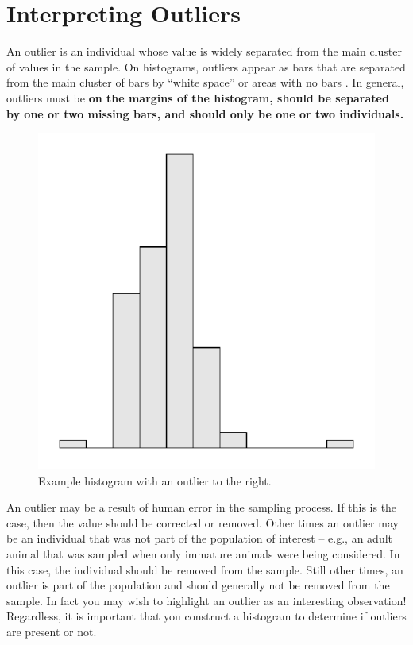 \documentclass[10pt,openany]{book}\usepackage[]{graphicx}\usepackage[]{color}
\newenvironment{knitrout}{}{} %
\begin{document}

\section{Interpreting Outliers}
An outlier is an individual whose value is widely separated from the main cluster of values in the sample. On histograms, outliers appear as bars that are separated from the main cluster of bars by ``white space'' or areas with no bars . In general, outliers must be \textbf{on the margins of the histogram, should be separated by one or two missing bars, and should only be one or two individuals.}

\begin{knitrout}
\color{fgcolor}\begin{figure}[hbtp]

{\centering \includegraphics[width=.4\linewidth]{Figs/OutlierExHist-1} 

}

\caption[Example histogram with an outlier to the right]{Example histogram with an outlier to the right.}\label{fig:OutlierExHist}
\end{figure}


\end{knitrout}

An outlier may be a result of human error in the sampling process. If this is the case, then the value should be corrected or removed. Other times an outlier may be an individual that was not part of the population of interest -- e.g., an adult animal that was sampled when only immature animals were being considered. In this case, the individual should be removed from the sample. Still other times, an outlier is part of the population and should generally not be removed from the sample. In fact you may wish to highlight an outlier as an interesting observation! Regardless, it is important that you construct a histogram to determine if outliers are present or not.
\end{document}
